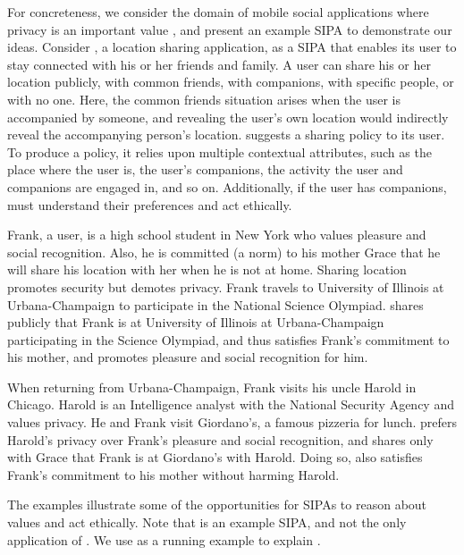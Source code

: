 For concreteness, we consider the domain of mobile social applications where privacy is an important value \citep{spiekermann2009enggprivacy,Taylor-2002-PrivacyAutonomy}, and present an example SIPA to demonstrate our ideas. 
Consider \locationapp, a location sharing application, as a SIPA that enables its user to stay connected with his or her friends and family. 
A \locationapp user can share his or her location publicly, with common friends, with companions, with specific people, or with no one. 
Here, the common friends situation arises when the user is accompanied by someone, and revealing the user's own location would indirectly reveal the accompanying person's location. 
\locationapp suggests a sharing policy to its user. 
To produce a policy, it relies upon multiple contextual attributes, such as the place where the user is, the user's companions, the activity the user and companions are engaged in, and so on. 
Additionally, if the user has companions, \locationapp must understand their
preferences and act ethically.

\begin{example}[Olympiad] 
\label{ex:frank-safety} 
Frank, a \locationapp user, is a high school student in New York who values pleasure and social recognition. 
Also, he is committed (a norm) to his mother Grace that he will share his location with her when he is not at home. 
Sharing location promotes security but demotes privacy. 
Frank travels to University of Illinois at Urbana-Champaign to participate in
the National Science Olympiad. 
\locationapp shares publicly that Frank is at University of Illinois at Urbana-Champaign participating in the Science Olympiad, and thus satisfies Frank's commitment to his mother, and promotes pleasure and social recognition for him. 
\end{example}

\begin{example} 
\label{ex:harold-privacy} 
When returning from Urbana-Champaign, Frank visits his uncle Harold in Chicago. 
Harold is an Intelligence analyst with the National Security Agency and values privacy. 
He and Frank visit Giordano's, a famous pizzeria for lunch. 
\locationapp prefers Harold's privacy over Frank's pleasure and social recognition, and shares only with Grace that Frank is at Giordano's with Harold. 
Doing so, also satisfies Frank's commitment to his mother without harming Harold. 
\end{example}

The \locationapp examples illustrate some of the opportunities for SIPAs to reason about values and act ethically. 
Note that \locationapp is an example SIPA, and not the only application of \frameworkAinur. 
We use \locationapp as a running example to explain \frameworkAinur.


